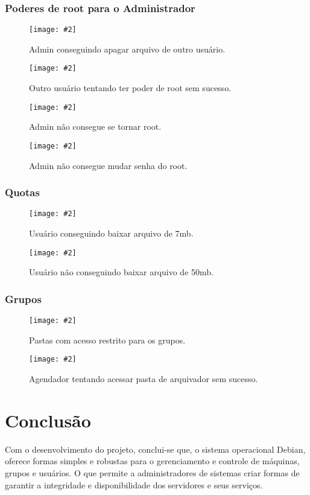 \documentclass[
	12pt,				%
	openany,			%
	a4paper,			%
	chapter=TITLE,		%
	section=TITLE,		%
	english,
	brazil				%
]{abntex2}
\newcommand{\includeImage}[3] {

\begin{figure}[H]
 	 \centering
  		\texttt{[image: \#2]}
  	\caption{#3}
\end{figure}

}
\begin{document}
\subsection{Poderes de root para o Administrador}

\includeImage{0.6}{imgs/testes/6-admin_deletando_arquivo_do_agendador_com_sucesso.png}{Admin conseguindo apagar arquivo de outro usuário.}

\includeImage{0.6}{imgs/testes/6-arquivador_tentando_apagar_o_arquivo_do_agendador_sem_sucesso.png}{Outro usuário tentando ter poder de root sem sucesso.}

\includeImage{0.55}{imgs/testes/6-admin_nao_consegue_se_tornar_root.png}{Admin não consegue se tornar root.}

\includeImage{0.55}{imgs/testes/6-admin_nao_consegue_mudar_senha_do_root.png}{Admin não consegue mudar senha do root.}

\subsection{Quotas}

\includeImage{0.55}{imgs/testes/6-agendador_baixando_arquivo_de_7mb_com_sucesso.png}{Usuário conseguindo baixar arquivo de 7mb.}

\includeImage{0.55}{imgs/testes/6-agendador_baixando_arquivo_de_50_sem_sucesso.png}{Usuário não conseguindo baixar arquivo de 50mb.}

\subsection{Grupos}

\includeImage{0.6}{imgs/testes/7-pastas_para_os_grupos_com_acesso_restrito.png}{Pastas com acesso restrito para os grupos.}

\includeImage{0.6}{imgs/testes/7-agendador_nao_conseguindo_escrever_na_pasta_de_arquivadores.png}{Agendador tentando acessar pasta de arquivador sem sucesso.}

\chapter{Conclusão}

Com o desenvolvimento do projeto, conclui-se que, o sistema operacional Debian, oferece formas simples e robustas para o gerenciamento e controle de máquinas, grupos e usuários. O que permite a administradores de sistemas criar formas de garantir a integridade e disponibilidade dos servidores e seus serviços.
\end{document}

